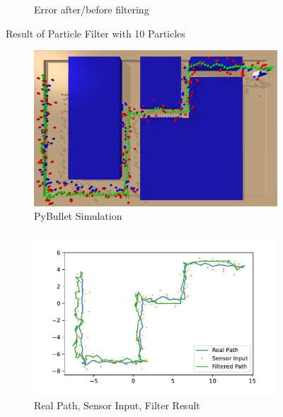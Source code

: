\documentclass[conference,onecolumn]{IEEEtran}
\begin{document}
\begin{figure}[H]
\begin{subfigure}[t]{.3\linewidth}
    \caption{Error after/before filtering}
  \end{subfigure}

   \smallskip\hrulefill \smallskip
  
  
  Result of Particle Filter with 10 Particles
  \medskip

  \begin{subfigure}[t]{.3\linewidth}
    \centering\includegraphics[width=\linewidth]{Figs/p10.png}
    \caption{PyBullet Simulation}
  \end{subfigure}
  \begin{subfigure}[t]{.3\linewidth}
    \centering\includegraphics[width=\linewidth]{Figs/Particle Filter + 10Path.pdf}
    \caption{Real Path, Sensor Input, Filter Result}
  \end{subfigure}
  \begin{subfigure}[t]{.3\linewidth}

\end{subfigure}
\end{figure}
\end{document}
